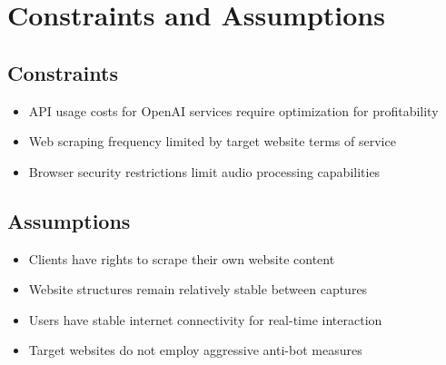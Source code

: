 \section{Constraints and Assumptions}

\subsection{Constraints}

\begin{itemize}[leftmargin=*]
    \item API usage costs for OpenAI services require optimization for profitability
    \item Web scraping frequency limited by target website terms of service
    \item Browser security restrictions limit audio processing capabilities
\end{itemize}

\subsection{Assumptions}

\begin{itemize}[leftmargin=*]
    \item Clients have rights to scrape their own website content
    \item Website structures remain relatively stable between captures
    \item Users have stable internet connectivity for real-time interaction
    \item Target websites do not employ aggressive anti-bot measures
\end{itemize}
